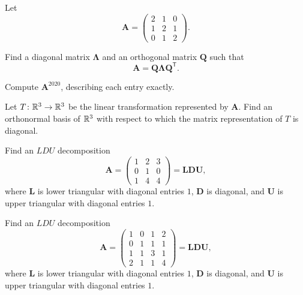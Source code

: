 \begin{problem}
Let
\[
\mathbf A=
\begin{pmatrix}
2&1&0\\
1&2&1\\
0&1&2
\end{pmatrix}.
\]
\begin{problemsubparts}
\item Find a diagonal matrix $\boldsymbol\Lambda$ and an orthogonal matrix $\mathbf Q$ such that
\[
\mathbf A=\mathbf Q\boldsymbol\Lambda\mathbf Q^{\mathsf T}.
\]
\item Compute $\mathbf A^{2020}$, describing each entry exactly.
\item Let $T\colon \mathbb{R}^3\to\mathbb{R}^3$ be the linear transformation represented by $\mathbf A$. Find an orthonormal basis of $\mathbb{R}^3$ with respect to which the matrix representation of $T$ is diagonal.
\end{problemsubparts}
\end{problem}

\begin{problem}
Find an $LDU$ decomposition
\[
\mathbf A=
\begin{pmatrix}
1&2&3\\
0&1&0\\
1&4&4
\end{pmatrix}
=\mathbf L\mathbf D\mathbf U,
\]
where $\mathbf L$ is lower triangular with diagonal entries $1$, $\mathbf D$ is diagonal, and $\mathbf U$ is upper triangular with diagonal entries $1$.
\end{problem}

\begin{problem}
Find an $LDU$ decomposition
\[
\mathbf A=
\begin{pmatrix}
1&0&1&2\\
0&1&1&1\\
1&1&3&1\\
2&1&1&4
\end{pmatrix}
=\mathbf L\mathbf D\mathbf U,
\]
where $\mathbf L$ is lower triangular with diagonal entries $1$, $\mathbf D$ is diagonal, and $\mathbf U$ is upper triangular with diagonal entries $1$.
\end{problem}

